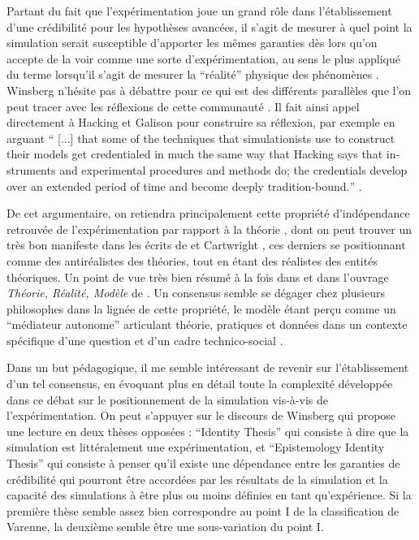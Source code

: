 Partant du fait que l'expérimentation joue un grand rôle dans l'établissement d'une crédibilité pour les hypothèses avancées, il s'agit de mesurer à quel point la simulation serait susceptible d'apporter les mêmes garanties dès lors qu'on accepte de la voir comme une sorte d'expérimentation, au sens le plus appliqué du terme lorsqu'il s'agit de mesurer la \enquote{réalité} physique des phénomènes . Winsberg n'hésite pas à débattre pour ce qui est des différents parallèles que l'on peut tracer avec les réflexions de cette communauté . Il fait ainsi appel directement à Hacking et Galison pour construire sa réflexion, par exemple en arguant \foreignquote{english}{ [...] that some of the techniques that simulationists use to construct their models get credentialed in much the same way that Hacking says that instruments and experimental procedures and methods do; the credentials develop over an extended period of time and become deeply tradition-bound.} \autocites{Winsberg2003, Winsberg2013} .

De cet argumentaire, on retiendra principalement cette propriété d'indépendance retrouvée de l'expérimentation par rapport à la théorie , dont on peut trouver un très bon manifeste dans les écrits de \textcite{Hacking1989} et Cartwright , ces derniers se positionnant comme des antiréalistes des théories, tout en étant des réalistes des entités théoriques. Un point de vue très bien résumé à la fois dans \textcite{Hacking1989} et dans l'ouvrage \textit{Théorie, Réalité, Modèle} de \textcite[226-231]{Varenne2012}. Un consensus semble se dégager chez plusieurs philosophes \autocites{Morgan2009, Varenne2001, Varenne2013b} dans la lignée de cette propriété, le modèle étant perçu comme un \enquote{médiateur autonome} articulant théorie, pratiques et données dans un contexte spécifique d'une question et d'un cadre technico-social \autocite[2]{Phan2010} .

Dans un but pédagogique, il me semble intéressant de revenir sur l'établissement d'un tel consensus, en évoquant plus en détail toute la complexité développée dans ce débat sur le positionnement de la simulation vis-à-vis de l'expérimentation. On peut s'appuyer sur le discours de Winsberg qui propose une lecture en deux thèses opposées : \foreignquote{english}{Identity Thesis} qui consiste à dire que la simulation est littéralement une expérimentation, et \foreignquote{english}{Epistemology Identity Thesis} qui consiste à penser qu'il existe une dépendance entre les garanties de crédibilité qui pourront être accordées par les résultats de la simulation et la capacité des simulations à être plus ou moins définies en tant qu'expérience. Si la première thèse semble assez bien correspondre au point I de la classification de Varenne, la deuxième semble être une sous-variation du point I.

